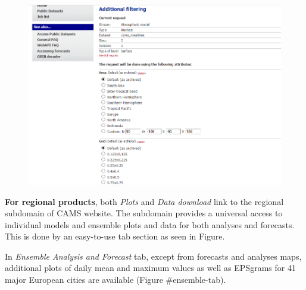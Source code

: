 \documentclass[9pt]{report}
\begin{document}
\begin{figure}[h!]%
\begin{mdcenter}%

\noindent{}\includegraphics[keepaspectratio=true,width=\dimmin{}{\dimwidth{0.90}}]{images/global_real_time_additional}{}%

\mdhr{}%

\noindent{}%
\end{mdcenter}\label{global-data-additional}%
\end{figure}%

\noindent{}\textbf{For regional products}, both \emph{Plots} and \emph{Data download} link to the regional subdomain of CAMS website.
The subdomain provides a universal access to individual models and ensemble plots and data for both analyses and forecasts.
This is done by an easy-to-use tab section as seen in Figure.%

In \emph{Ensemble Analysis and Forecast} tab, except from forecasts and analyses maps, additional plots of daily mean and maximum values as well as EPSgrams for 41 major European cities are available (Figure \#ensemble-tab).%
\end{document}

